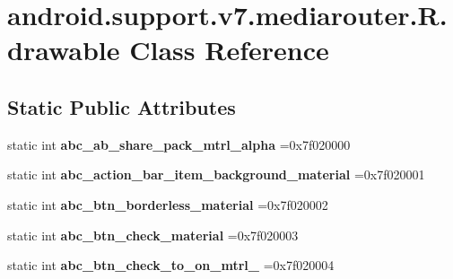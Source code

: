\hypertarget{classandroid_1_1support_1_1v7_1_1mediarouter_1_1R_1_1drawable}{}\section{android.\+support.\+v7.\+mediarouter.\+R.\+drawable Class Reference}
\label{classandroid_1_1support_1_1v7_1_1mediarouter_1_1R_1_1drawable}
\subsection*{Static Public Attributes}
\begin{DoxyCompactItemize}
\item 
\mbox{\label{classandroid_1_1support_1_1v7_1_1mediarouter_1_1R_1_1drawable_a7bc1f1a6fd06055dec43e95e6c90e5a8}} 
static int {\bfseries abc\+\_\+ab\+\_\+share\+\_\+pack\+\_\+mtrl\+\_\+alpha} =0x7f020000
\item 
\mbox{\label{classandroid_1_1support_1_1v7_1_1mediarouter_1_1R_1_1drawable_add10eec7094f03cdccdb779b2548c3cd}} 
static int {\bfseries abc\+\_\+action\+\_\+bar\+\_\+item\+\_\+background\+\_\+material} =0x7f020001
\item 
\mbox{\label{classandroid_1_1support_1_1v7_1_1mediarouter_1_1R_1_1drawable_ab356e900dc8ffe8ff5e27f35d0e8ef50}} 
static int {\bfseries abc\+\_\+btn\+\_\+borderless\+\_\+material} =0x7f020002
\item 
\mbox{\label{classandroid_1_1support_1_1v7_1_1mediarouter_1_1R_1_1drawable_a50378580a5b80004591f66fb4175c79d}} 
static int {\bfseries abc\+\_\+btn\+\_\+check\+\_\+material} =0x7f020003
\item 
\mbox{\label{classandroid_1_1support_1_1v7_1_1mediarouter_1_1R_1_1drawable_adf979859ba3138ba8c77e6a67e30c7d5}} 
static int {\bfseries abc\+\_\+btn\+\_\+check\+\_\+to\+\_\+on\+\_\+mtrl\+\_} =0x7f020004
\item 
\mbox{\label{classandroid_1_1support_1_1v7_1_1mediarouter_1_1R_1_1drawable_a6650b8a868969f12828a67ac588245c4}} 

\end{DoxyCompactItemize}

